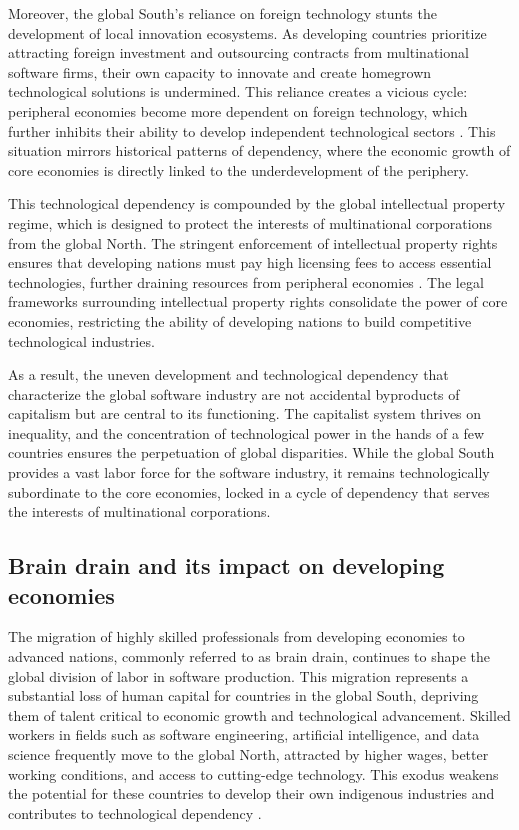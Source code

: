 \begin{refsection}
Moreover, the global South's reliance on foreign technology stunts the development of local innovation ecosystems. As developing countries prioritize attracting foreign investment and outsourcing contracts from multinational software firms, their own capacity to innovate and create homegrown technological solutions is undermined. This reliance creates a vicious cycle: peripheral economies become more dependent on foreign technology, which further inhibits their ability to develop independent technological sectors \cite[pp.~101-103]{foster2011}. This situation mirrors historical patterns of dependency, where the economic growth of core economies is directly linked to the underdevelopment of the periphery.

This technological dependency is compounded by the global intellectual property regime, which is designed to protect the interests of multinational corporations from the global North. The stringent enforcement of intellectual property rights ensures that developing nations must pay high licensing fees to access essential technologies, further draining resources from peripheral economies \cite[pp.~53-55]{harvey2021}. The legal frameworks surrounding intellectual property rights consolidate the power of core economies, restricting the ability of developing nations to build competitive technological industries.

As a result, the uneven development and technological dependency that characterize the global software industry are not accidental byproducts of capitalism but are central to its functioning. The capitalist system thrives on inequality, and the concentration of technological power in the hands of a few countries ensures the perpetuation of global disparities. While the global South provides a vast labor force for the software industry, it remains technologically subordinate to the core economies, locked in a cycle of dependency that serves the interests of multinational corporations.

\subsection{Brain drain and its impact on developing economies}

The migration of highly skilled professionals from developing economies to advanced nations, commonly referred to as brain drain, continues to shape the global division of labor in software production. This migration represents a substantial loss of human capital for countries in the global South, depriving them of talent critical to economic growth and technological advancement. Skilled workers in fields such as software engineering, artificial intelligence, and data science frequently move to the global North, attracted by higher wages, better working conditions, and access to cutting-edge technology. This exodus weakens the potential for these countries to develop their own indigenous industries and contributes to technological dependency \cite[pp.~191-193]{kapur2010}.


\end{refsection}
